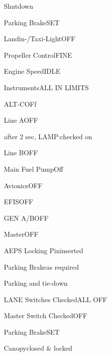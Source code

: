\begin{checklist}{Shutdown}
  \item{Parking Brake}{SET}
  \item{Landin-/Taxi-Light}{OFF}
  \item{Propeller Control}{FINE}
  \item{Engine Speed}{IDLE}
  \item{Instruments}{ALL IN LIMITS}
  \item{ALT-C}{OFf}
  \item{Line A}{OFF}
  \item{after 2 sec, LAMP:}{checked on}
  \item{Line B}{OFF}
  \item{Main Fuel Pump}{Off}
  \item{Avionics}{OFF}
  \item{EFIS}{OFF}
  \item{GEN A/B}{OFF}
  \item{Master}{OFF}
  \item{AEPS Locking Pin}{inserted}
  \item{Parking Brake}{as required}
\end{checklist}

\begin{checklist}{Parking and tie-down}
  \item{LANE Switches Checked}{ALL OFF}
  \item{Master Switch Checked}{OFF}
  \item{Parking Brake}{SET}
  \item{Canopy}{closed \& locked}
\end{checklist}


